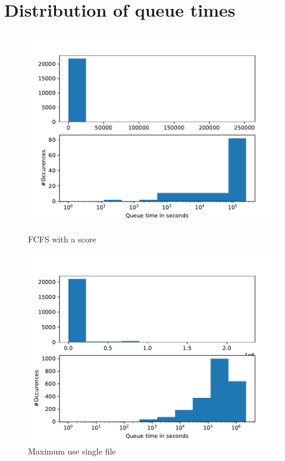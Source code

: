 \documentclass[a4paper]{article}
\begin{document}
\section{Distribution of queue times}
\begin{figure}[H] 
  \label{ fig7} 
  \begin{minipage}[b]{0.5\linewidth}
    \centering
    \includegraphics[width=1.11\linewidth]{MBSS/plot/Distribution/Queue_Times/Fcfs_with_a_score_2021-05-23.pdf}
    \caption{FCFS with a score} 
    \vspace{4ex}
  \end{minipage}%
  \begin{minipage}[b]{0.5\linewidth}
    \centering
    \includegraphics[width=1.11\linewidth]{MBSS/plot/Distribution/Queue_Times/Maximum_use_single_file_2021-05-23.pdf}
    \caption{Maximum use single file} 
    \vspace{4ex}
  \end{minipage} 
\end{figure}

\end{document}
